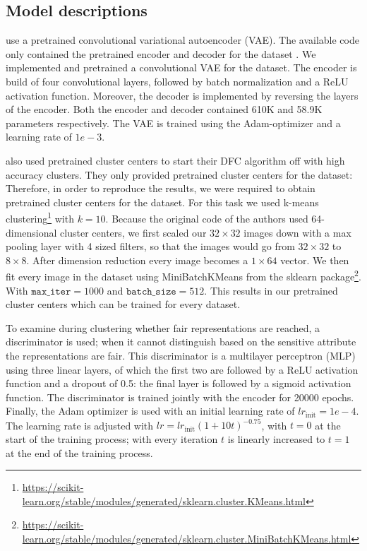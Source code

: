 \subsection{Model descriptions}
\citet{Li_2020_CVPR} use a pretrained convolutional variational autoencoder (VAE). The available code only contained the pretrained encoder and decoder for the \USPSMNIST dataset \citep{git}. We implemented and pretrained a convolutional VAE for the \revMNIST dataset. The encoder is build of four convolutional layers, followed by batch normalization and a ReLU activation function. Moreover, the decoder is implemented by reversing the layers of the encoder. Both the encoder and decoder contained 610K and 58.9K parameters respectively. The VAE is trained using the Adam-optimizer and a learning rate of $1e-3$. 

\citet{Li_2020_CVPR} also used pretrained cluster centers to start their DFC algorithm off with high accuracy clusters. They only provided pretrained cluster centers for the \USPSMNIST dataset: Therefore, in order to reproduce the results, we were required to obtain pretrained cluster centers for the \revMNIST dataset. For this task we used k-means clustering\footnote{\url{https://scikit-learn.org/stable/modules/generated/sklearn.cluster.KMeans.html}} with $k=10$. Because the original code of the authors used 64-dimensional cluster centers, we first scaled our $32\times 32$ images down with a max pooling layer with 4 sized filters, so that the images would go from $32\times 32$ to $8\times 8$. After dimension reduction every image becomes a $1\times 64$ vector. We then fit every image in the dataset using MiniBatchKMeans from the sklearn package\footnote{\url{https://scikit-learn.org/stable/modules/generated/sklearn.cluster.MiniBatchKMeans.html}}. With $\texttt{max\_iter}=1000$ and $\texttt{batch\_size} = 512$. This results in our pretrained cluster centers which can be trained for every dataset.

To examine during clustering whether fair representations are reached, a discriminator is used; when it cannot distinguish based on the sensitive attribute the representations are fair. This discriminator is a multilayer perceptron (MLP) using three linear layers, of which the first two are followed by a ReLU activation function and a dropout of 0.5: the final layer is followed by a sigmoid activation function. The discriminator is trained jointly with the encoder for 20000 epochs. Finally, the Adam optimizer is used with an initial learning rate of $lr_{\text{init}}=1e-4$. The learning rate is adjusted with $lr =lr_{\text{init}}(1+10t)^{-0.75}$, with $t=0$ at the start of the training process; with every iteration $t$ is linearly increased to $t=1$ at the end of the training process.




